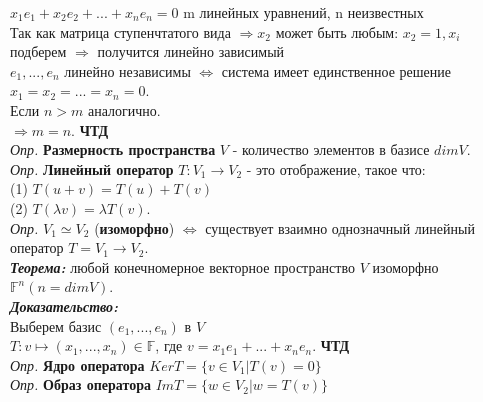 \documentclass[12pt, oneside]{book}
\theoremstyle{definition}
\begin{document}
\begin{enumerate}
$x_1 e_1 + x_2 e_2 + ... + x_n e_n = 0$ m линейных уравнений, n неизвестных \\
Так как матрица ступенчтатого вида $\Rightarrow x_2$ может быть любым: $x_2 = 1, x_i$ подберем $\Rightarrow$ получится линейно зависимый \\
$e_1, ... , e_n$ линейно независимы $\Leftrightarrow$ система имеет единственное решение $x_1 = x_2 = ... = x_n = 0.$\\
Если $n > m$ аналогично. \\
$\Rightarrow m = n$. \textbf{ЧТД} \\
\textit{Опр.} \textbf{Размерность пространства} $V$ - количество элементов в базисе $dim V$.\\
\textit{Опр.} \textbf{Линейный оператор} $T: V_1 \rightarrow V_2$ - это отображение, такое что: \\
(1) $T(u + v) = T(u) + T(v)$\\
(2) $T(\lambda v) = \lambda T(v)$.\\
\textit{Опр.} $V_1 \simeq V_2$ (\textbf{изоморфно}) $\Leftrightarrow$ существует взаимно однозначный линейный оператор $T = V_1 \rightarrow V_2$.\\
\textit{\textbf{Теорема:}} любой конечномерное векторное пространство $V$ изоморфно $\mathbb{F}^n (n = dim V)$.\\
\textit{\textbf{Доказательство:}} \\
Выберем базис $(e_1, ... , e_n)$ в $V$\\
$T: v \mapsto (x_1, ... , x_n) \in \mathbb{F}$, где $v = x_1 e_1 + ... + x_n e_n$. \textbf{ЧТД} \\
\textit{Опр.} \textbf{Ядро оператора} $Ker T = \{ v \in V_1 | T(v) = 0 \}$ \\
\textit{Опр.} \textbf{Образ оператора} $Im T = \{ w \in V_2 | w = T(v) \}$ \\


\end{enumerate}
\end{document}

